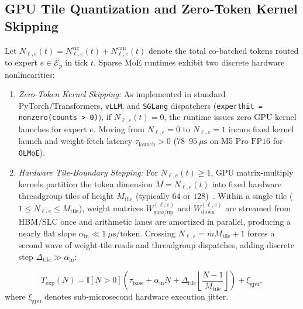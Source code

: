 \documentclass[11pt,a4paper]{article}
\renewcommand{\_}{\textunderscore\allowbreak}
\theoremstyle{definition}
\theoremstyle{remark}
\begin{document}
\subsection{GPU Tile Quantization and Zero-Token Kernel Skipping}
Let $N_{\ell, e}(t) = N_{\ell, e}^{\mathrm{vic}}(t) + N_{\ell, e}^{\mathrm{can}}(t)$ denote the total co-batched tokens routed to expert $e \in \mathcal{E}_p$ in tick $t$. Sparse MoE runtimes exhibit two discrete hardware nonlinearities:
\begin{enumerate}
  \item \emph{Zero-Token Kernel Skipping:} As implemented in standard PyTorch/Transformers, \texttt{vLLM}, and \texttt{SGLang} dispatchers (\texttt{expert\_hit = nonzero(counts > 0)}), if $N_{\ell, e}(t) = 0$, the runtime issues zero GPU kernel launches for expert $e$. Moving from $N_{\ell, e} = 0$ to $N_{\ell, e} = 1$ incurs fixed kernel launch and weight-fetch latency $\tau_{\mathrm{launch}} > 0$ ($78$--$95~\mu\mathrm{s}$ on M5 Pro $\mathrm{FP16}$ for \texttt{OLMoE}).
  \item \emph{Hardware Tile-Boundary Stepping:} For $N_{\ell, e}(t) \ge 1$, GPU matrix-multiply kernels partition the token dimension $M = N_{\ell, e}(t)$ into fixed hardware threadgroup tiles of height $M_{\mathrm{tile}}$ (typically $64$ or $128$)~\cite{tan2025gpugemmcliff}. Within a single tile ($1 \le N_{\ell, e} \le M_{\mathrm{tile}}$), weight matrices $W_{\mathrm{gate/up}}^{(\ell, e)}$ and $W_{\mathrm{down}}^{(\ell, e)}$ are streamed from HBM/SLC once and arithmetic lanes are amortized in parallel, producing a nearly flat slope $\alpha_{\mathrm{in}} \ll 1~\mu\mathrm{s}/\text{token}$. Crossing $N_{\ell, e} = m M_{\mathrm{tile}} + 1$ forces a second wave of weight-tile reads and threadgroup dispatches, adding discrete step $\Delta_{\mathrm{tile}} \gg \alpha_{\mathrm{in}}$:
\end{enumerate}
\begin{equation}\label{eq:piecewise_latency}
  T_{\mathrm{exp}}(N) = \mathbb{I}[N > 0] \left( \tau_{\mathrm{base}} + \alpha_{\mathrm{in}} N + \Delta_{\mathrm{tile}} \left\lfloor \frac{N - 1}{M_{\mathrm{tile}}} \right\rfloor \right) + \xi_{\mathrm{gpu}},
\end{equation}
where $\xi_{\mathrm{gpu}}$ denotes sub-microsecond hardware execution jitter.
\end{document}
